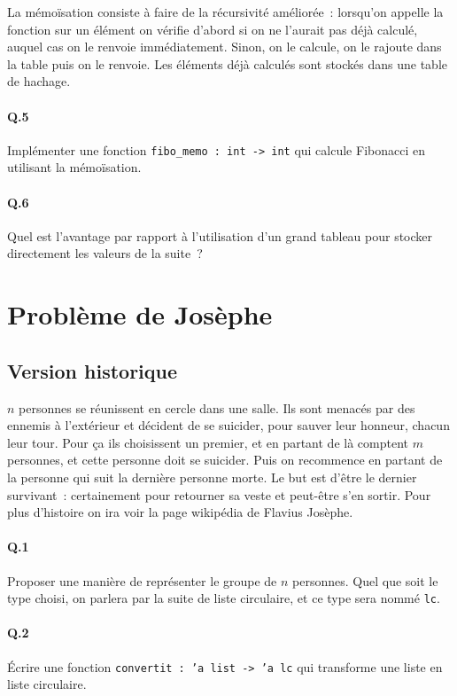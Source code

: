 \documentclass[10pt,a4paper]{article}
\begin{document}
La mémoïsation consiste à faire de la récursivité améliorée~: lorsqu'on appelle la fonction sur un élément on vérifie d'abord si on ne l'aurait pas déjà calculé, auquel cas on le renvoie immédiatement. Sinon, on le calcule, on le rajoute dans la table puis on le renvoie. Les éléments déjà calculés sont stockés dans une table de hachage.

\paragraph{Q.5} Implémenter une fonction \texttt{fibo\_memo : int -> int} qui calcule Fibonacci en utilisant la mémoïsation.

\paragraph{Q.6} Quel est l'avantage par rapport à l'utilisation d'un grand tableau pour stocker directement les valeurs de la suite~?

\section{Problème de Josèphe}

\subsection{Version historique}
$n$ personnes se réunissent en cercle dans une salle. Ils sont menacés par des ennemis à l'extérieur et décident de se suicider, pour sauver leur honneur, chacun leur tour. Pour ça ils choisissent un premier, et en partant de là comptent $m$ personnes, et cette personne doit se suicider. Puis on recommence en partant de la personne qui suit la dernière personne morte. Le but est d'être le dernier survivant~: certainement pour retourner sa veste et peut-être s'en sortir. Pour plus d'histoire on ira voir la page wikipédia de Flavius Josèphe.

\paragraph{Q.1} Proposer une manière de représenter le groupe de $n$ personnes. Quel que soit le type choisi, on parlera par la suite de \og liste circulaire\fg{}, et ce type sera nommé \texttt{lc}.

\paragraph{Q.2} Écrire une fonction \texttt{convertit : 'a list -> 'a lc} qui transforme une liste en liste circulaire.
\end{document}
